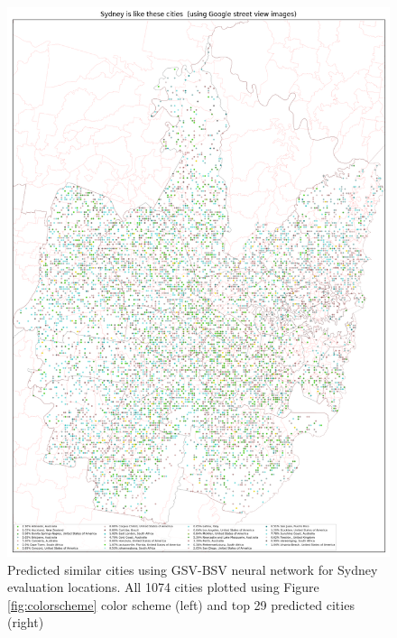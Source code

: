 \documentclass[sageh,times]{sagej}
\begin{document}
\begin{figure}[!htbp]
\includegraphics[scale=0.20]{Images/SydneyOverallAbrev_street.png}  
\caption{Predicted similar cities using GSV-BSV neural network for Sydney evaluation locations. All 1074 cities plotted using Figure \ref{fig:colorscheme} color scheme (left) and top 29 predicted cities (right)}    
 \label{fig:sydstreet}  
\end{figure} 


\end{document}
